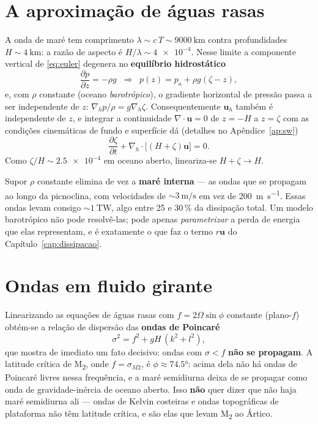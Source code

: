 \documentclass[11pt,a4paper,oneside]{report}
\theoremstyle{definition}
\theoremstyle{plain}
\theoremstyle{remark}
\newcommand{\vect}[1]{\bm{#1}}
\newcommand{\pd}[2]{\frac{\partial #1}{\partial #2}}
\begin{document}
\section{A aproximação de águas rasas}
\label{sec:aguasrasas}

A onda de maré tem comprimento $\lambda\sim c\,T\sim\SI{9000}{\kilo\meter}$
contra profundidades $H\sim\SI{4}{\kilo\meter}$: a razão de aspecto é
$H/\lambda\sim\num{4e-4}$. Nesse limite a componente vertical de
\eqref{eq:euler} degenera no \textbf{equilíbrio hidrostático}
\begin{equation}
\pd{p}{z}=-\rho g \;\;\Longrightarrow\;\; p(z)=p_a+\rho g(\zeta-z),
\end{equation}
e, com $\rho$ constante (oceano \emph{barotrópico}), o gradiente horizontal de
pressão passa a ser independente de $z$:
$\nabla_h p/\rho=g\nabla_h\zeta$. Consequentemente $\vect{u}_h$ também é
independente de $z$, e integrar a continuidade
$\nabla\cdot\vect{u}=0$ de $z=-H$ a $z=\zeta$ com as condições cinemáticas de
fundo e superfície dá (detalhes no Apêndice~\ref{ap:sw})
\begin{equation}
\pd{\zeta}{t}+\nabla_h\cdot\big[(H+\zeta)\vect{u}\big]=0.
\end{equation}
Como $\zeta/H\sim\num{2.5e-4}$ em oceano aberto, lineariza-se $H+\zeta\to H$.

\begin{caixa}
Supor $\rho$ constante elimina de vez a \textbf{maré interna} — as ondas que se
propagam ao longo da picnoclina, com velocidades de $\sim\SI{3}{\meter\per
\second}$ em vez de \SI{200}{\meter\per\second}. Essas ondas levam consigo
$\sim\SI{1}{\tera\watt}$, algo entre 25 e 30\,\% da dissipação total. Um modelo
barotrópico não pode resolvê-las; pode apenas \emph{parametrizar} a perda de
energia que elas representam, e é exatamente o que faz o termo $r\vect{u}$ do
Capítulo~\ref{cap:dissipacao}.
\end{caixa}

\section{Ondas em fluido girante}
\label{sec:ondas}

Linearizando as equações de águas rasas com $f=2\Omega\sin\phi$ constante
(plano-$f$) obtém-se a relação de dispersão das \textbf{ondas de Poincaré}
\begin{equation}
\sigma^{2}=f^{2}+gH\,(k^{2}+l^{2}),
\label{eq:poincare}
\end{equation}
que mostra de imediato um fato decisivo: ondas com $\sigma<f$ \textbf{não se
propagam}. A latitude crítica de M\textsubscript{2}, onde $f=\sigma_{M2}$, é
$\phi\approx\ang{74.5}$: acima dela não há ondas de Poincaré livres nessa
frequência, e a maré semidiurna deixa de se propagar como onda de
gravidade-inércia de oceano aberto. Isso \textbf{não} quer dizer que não haja
maré semidiurna ali — ondas de Kelvin costeiras e ondas topográficas de
plataforma não têm latitude crítica, e são elas que levam M\textsubscript{2} ao
Ártico.
\end{document}
